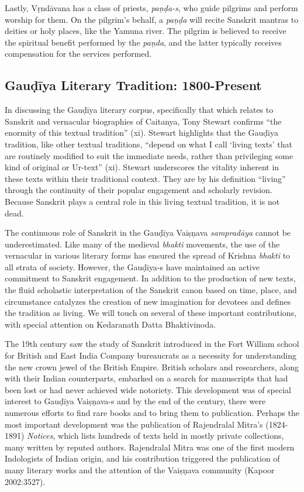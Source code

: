 Lastly, Vṛndāvana has a class of priests, {\sl paṇḍa-s}, who guide pilgrims and perform worship for them. On the pilgrim’s behalf, a {\sl paṇḍa} will recite Sanskrit mantras to deities or holy places, like the Yamuna river. The pilgrim is believed to receive the spiritual benefit performed by the {\sl paṇda}, and the latter typically receives compensation for the services performed.
\vskip -40pt

\subsection*{Gauḍīya Literary Tradition: 1800-Present}
\vskip -10pt

In discussing the Gauḍīya literary corpus, specifically that which relates to Sanskrit and vernacular biographies of Caitanya, Tony Stewart confirms “the enormity of this textual tradition” (xi). Stewart highlights that the Gauḍīya tradition, like other textual traditions, “depend on what I call ‘living texts’ that are routinely modified to suit the immediate needs, rather than privileging some kind of original or Ur-text” (xi). Stewart underscores the vitality inherent in these texts within their traditional context. They are by his definition “living” through the continuity of their popular engagement and scholarly revision. Because Sanskrit plays a central role in this living textual tradition, it is not dead.

The continuous role of Sanskrit in the Gauḍīya Vaiṣṇava {\sl sampradāya} cannot be underestimated. Like many of the medieval {\sl bhakti} movements, the use of the vernacular in various literary forms has ensured the spread of Krishna {\sl bhakti} to all strata of society. However, the Gauḍīya-s have maintained an active commitment to Sanskrit engagement. In addition to the production of new texts, the fluid scholastic interpretation of the Sanskrit canon based on time, place, and circumstance catalyzes the creation of new imagination for devotees and defines the tradition as living. We will touch on several of these important contributions, with special attention on Kedaranath Datta Bhaktivinoda. 

The 19th century saw the study of Sanskrit introduced in the Fort William school for British and East India Company bureaucrats as a necessity for understanding the new crown jewel of the British Empire. British scholars and researchers, along with their Indian counterparts, embarked on a search for manuscripts that had been lost or had never achieved wide notoriety. This development was of special interest to Gauḍīya Vaiṣṇava-s and by the end of the century, there were numerous efforts to find rare books and to bring them to publication. Perhaps the most important development was the publication of Rajendralal Mitra's (1824-1891) {\sl Notices}, which lists hundreds of texts held in mostly private collections, many written by reputed authors. Rajendralal Mitra was one of the first modern Indologists of Indian origin, and his contribution triggered the publication of many literary works and the attention of the Vaiṣṇava community (Kapoor 2002:3527). 

